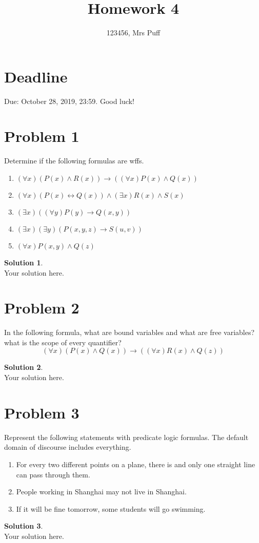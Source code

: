 \documentclass[a4paper,UTF8]{article}
\theoremstyle{definition}
\newtheorem*{solution}{Solution}
\begin{document}
\title{Homework 4}
\author{123456, Mrs Puff}
\maketitle

\section*{Deadline}
Due: October 28, 2019, 23:59. Good luck!

\section*{Problem 1}
Determine if the following formulas are wffs.
\begin{enumerate}
\item $(\forall x)( P(x)\wedge R(x) )\rightarrow( (\forall x)P(x)\wedge Q(x) )$
\item $ (\forall x)( P(x)\leftrightarrow Q(x) )\wedge(\exists x)R(x)\wedge S(x) $
\item $ (\exists x)( (\forall y)P(y)\rightarrow Q(x,y) ) $
\item $ (\exists x)(\exists y)( P(x,y,z)\rightarrow S(u,v) ) $
\item $ ( \forall x )P(x,y)\wedge Q(z) $
\end{enumerate}
\begin{solution}
~\\
Your solution here.
\end{solution}

\section*{Problem 2}
In the following formula, what are bound variables and what are free variables? what is the scope of every quantifier?
\[
(\forall x)( P(x)\wedge Q(x) )\rightarrow( (\forall x)R(x)\wedge Q(z) )
\]
\begin{solution}
~\\
Your solution here.
\end{solution}

\section*{Problem 3}
Represent the following statements with predicate logic formulas. The default domain of discourse includes everything.
\begin{enumerate}
\item For every two different points on a plane, there is and only one straight line can pass through them.
\item People working in Shanghai may not live in Shanghai.
\item If it will be fine tomorrow, some students will go swimming.
\end{enumerate}
\begin{solution}
~\\
Your solution here.
\end{solution}
\end{document}
